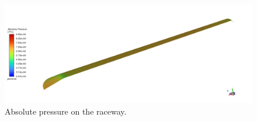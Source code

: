 \documentclass[12pt]{article}
\begin{document}
\begin{figure}[H]
    \centering
    \includegraphics[width=0.495\linewidth]{figs/t34s/t34s_M0p65_raceway_absP.png}    \caption{Absolute pressure on the raceway.}
    \label{fig:t35s_raceway_pabs}
\end{figure}
\end{document}
